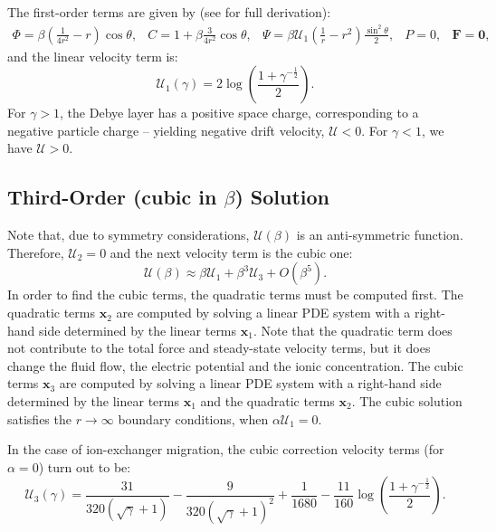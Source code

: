 \documentclass[10pt]{ijnam}
\newcommand{\pars}[1]{\left(#1\right)}
\newcommand\bF{\boldsymbol{F}}
\newcommand\bx{\boldsymbol{x}}
\newcommand\bzero{\boldsymbol{0}}
\newcommand\cU{\mathscr{U}}
\begin{document}
The first-order terms are given by (see \cite{yariv2010migration} for full derivation):
\begin{equation} \begin{array}{ccccc}
\varPhi = \beta \pars{\frac{1}{4r^2} - r}\cos\theta, &
C = 1 + \beta \frac{3}{4r^2} \cos\theta, &
\Psi = \beta \cU_1 \pars{\frac{1}{r} - r^2} \frac{\sin^2\theta}{2}, &
P = 0, &
\bF = \bzero,
\end{array} \end{equation}
and the linear velocity term is:
\begin{equation} \label{eq:linear_velocity}
\cU_1(\gamma) = 2 \log \pars{\frac{1 + \gamma^{-\frac{1}{2}}}{2}}.
\end{equation}
For $\gamma > 1$, the Debye layer has a positive space charge, 
corresponding to a negative particle charge -- 
yielding negative drift velocity, $\cU < 0$. 
For $\gamma < 1$, we have $\cU > 0$.

\subsection{Third-Order (cubic in $\beta$) Solution} \label{app:cubic}
Note that, due to symmetry considerations, $\cU(\beta)$ is an anti-symmetric function.
Therefore, $\cU_2 = 0$ and the next velocity term is the cubic one:
\begin{equation} \label{eq:cubic}
\cU(\beta) \approx \beta \cU_1 + \beta^3 \cU_3 + O(\beta^5).
\end{equation}
In order to find the cubic terms, the quadratic terms must be computed first.
The quadratic terms $\bx_2$ are computed by solving a linear PDE system 
with a right-hand side determined by the linear terms $\bx_1$.
Note that the quadratic term does not contribute to the total force and steady-state 
velocity terms, but it does change the fluid flow, 
the electric potential and the ionic concentration.
The cubic terms $\bx_3$ are computed by solving a linear PDE system 
with a right-hand side determined by the linear terms $\bx_1$ and the quadratic terms $\bx_2$.
The cubic solution satisfies the ${r\rightarrow\infty}$ boundary conditions, 
when $\alpha\cU_1 = 0$.

In the case of ion-exchanger migration,
the cubic correction \cite{zeyde2012report} velocity terms (for $\alpha = 0$)
turn out to be:
\begin{equation}
\cU_3(\gamma) = \frac{31}{320(\sqrt\gamma + 1)} - \frac{9}{320(\sqrt\gamma + 1)^2} + \frac{1}{1680} - \frac{11}{160} \log \pars{\frac{1 + \gamma^{-\frac{1}{2}}}{2}}.
\end{equation}
\end{document}
